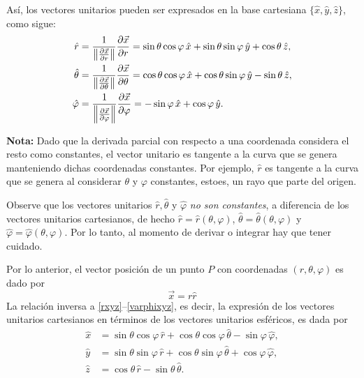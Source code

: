 Así, los vectores unitarios pueden ser expresados en la base cartesiana $\{\hat{x}, \hat{y}, \hat{z}\}$, como sigue:
\begin{align}
    \hat{r} &= \frac{1}{\left\lVert\frac{\partial \Vec{x}}{\partial r}\right\rVert}\frac{\partial \Vec{x}}{\partial r} = \sin \theta \cos \varphi \,\hat{x} + \sin \theta \sin \varphi \,\hat{y} + \cos \theta \,\hat{z}, \label{rxyz} \\
    \hat{\theta} &= \frac{1}{\left\lVert\frac{\partial \Vec{x}}{\partial \theta}\right\rVert}\frac{\partial \Vec{x}}{\partial \theta} = \cos \theta \cos \varphi \,\hat{x} + \cos \theta \sin \varphi \,\hat{y} - \sin \theta   \,\hat{z},  \\
    \hat{\varphi} &= \frac{1}{\left\lVert\frac{\partial \Vec{x}}{\partial \varphi}\right\rVert}\frac{\partial \Vec{x}}{\partial \varphi} = - \sin \varphi \,\hat{x} + \cos \varphi \,\hat{y} . \label{varphixyz}
\end{align}

\textbf{Nota:} Dado que la derivada parcial con respecto a una coordenada considera el resto como constantes, el vector unitario es tangente a la curva que se genera manteniendo dichas coordenadas constantes. Por ejemplo, $\hat{r}$ es tangente a la curva que se genera al considerar $\theta$ y $\varphi$ constantes, estoes, un rayo que parte del origen.

Observe que los vectores unitarios $\hat{r}, \hat{\theta}$ y $\hat{\varphi}$ \textit{no son constantes}, a diferencia de los vectores unitarios cartesianos, de hecho $\hat{r} = \hat{r}(\theta,\varphi)$, $\hat{\theta} = \hat{\theta}(\theta,\varphi)$ y $\hat{\varphi} = \hat{\varphi}(\theta,\varphi)$. Por lo tanto, al momento de derivar o integrar hay que tener cuidado.

Por lo anterior, el vector posición de un punto $P$ con coordenadas $(r, \theta, \varphi)$ es dado por
\begin{equation}
\vec{x} = r \hat{r}
\end{equation}
La relación inversa a \eqref{rxyz}--\eqref{varphixyz}, es decir, la expresión de los vectores unitarios cartesianos en términos de los vectores unitarios esféricos, es dada por
\begin{align}
    \hat{x} &= \sin \theta \cos \varphi \,\hat{r} + \cos \theta \cos \varphi \,\hat{\theta} - \sin \varphi \,\hat{\varphi},\\
    \hat{y} &= \sin \theta \sin\varphi \,\hat{r} + \cos \theta \sin \varphi \,\hat{\theta} + \cos \varphi \,\hat{\varphi}, \\
    \hat{z} &= \cos \theta \,\hat{r} - \sin \theta \,\hat{\theta}.
\end{align}

